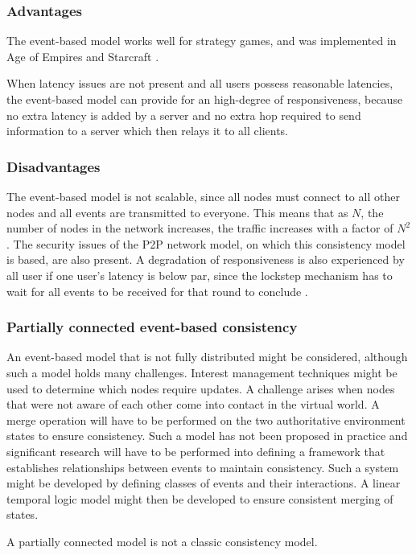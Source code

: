 \subsubsection{Advantages}
The event-based model works well for strategy games, and was implemented in Age of Empires \cite{p2p_cm_aoe} and Starcraft \cite{starcraft_network_model}.

When latency issues are not present and all users possess reasonable latencies, the event-based model can provide for an high-degree of responsiveness, because no extra latency is added by a server and no extra hop required to send information to a server which then relays it to all clients.

\subsubsection{Disadvantages}
The event-based model is not scalable, since all nodes must connect to all other nodes and all events are transmitted to
everyone. This means that as $N$, the number of nodes in the network increases, the traffic increases with a factor of $N^2$. The security issues of
the P2P network model, on which this consistency model is based, are also present. A degradation of responsiveness is also experienced by all user if one user's
latency is below par, since the lockstep mechanism has to wait for all events to be received for that round to conclude \cite{cheat_proof_event_ordering}.

\subsubsection{Partially connected event-based consistency}
An event-based model that is not fully distributed might be considered, although such a model holds many challenges. Interest management techniques might be used to determine which nodes require updates. A challenge arises when nodes that were not aware of each other come into contact in the virtual world. A merge operation will have to be performed on the two authoritative environment states to ensure consistency. Such a model has not been proposed in practice and significant research will have to be performed into defining a framework that establishes relationships between events to maintain consistency. Such a system might be developed by defining classes of events and their interactions. A linear temporal logic model might then be developed to ensure consistent merging of states.

A partially connected model is not a classic consistency model.

